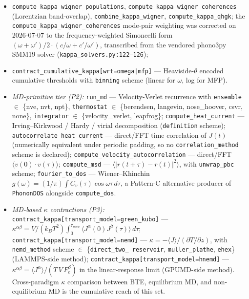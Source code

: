\documentclass[11pt,a4paper]{article}
\begin{document}
\begin{itemize}[leftmargin=2em, itemsep=0.2em]
  \item \texttt{compute\_kappa\_wigner\_populations},
        \texttt{compute\_kappa\_wigner\_coherences} (Lorentzian
        band-overlap), \texttt{combine\_kappa\_wigner},
        \texttt{compute\_kappa\_qhgk}; the \texttt{compute\_kappa\_wigner\_coherences}
        mode-pair weighting was corrected on 2026-07-07 to the frequency-weighted
        Simoncelli form $(\omega+\omega')/2\cdot(c/\omega + c'/\omega')$,
        transcribed from the vendored phono3py SMM19 solver
        (\texttt{kappa\_solvers.py:122--126});
  \item \texttt{contract\_cumulative\_kappa[wrt=omega|mfp]} ---
        Heaviside-$\theta$ encoded cumulative thresholds with
        \texttt{binning} scheme (linear for $\omega$, log for MFP).
  \item \emph{MD-primitive tier (P2):}
        \texttt{run\_md} --- Velocity-Verlet recurrence with
        \texttt{ensemble} $\in$ \{nve, nvt, npt\},
        \texttt{thermostat} $\in$ \{berendsen, langevin, nose\_hoover,
        csvr, none\}, \texttt{integrator} $\in$ \{velocity\_verlet,
        leapfrog\};
        \texttt{compute\_heat\_current} --- Irving--Kirkwood / Hardy
        / virial decomposition (\texttt{definition} scheme);
        \texttt{autocorrelate\_heat\_current} --- direct/FFT time
        correlation of $J(t)$ (numerically equivalent under periodic
        padding, so no \texttt{correlation\_method} scheme is declared);
        \texttt{compute\_velocity\_autocorrelation} --- direct/FFT
        $\langle v(0)\cdot v(\tau)\rangle$;
        \texttt{compute\_msd} --- $\langle |r(t+\tau)-r(t)|^2\rangle$,
        with \texttt{unwrap\_pbc} scheme;
        \texttt{fourier\_to\_dos} --- Wiener--Khinchin $g(\omega) =
        (1/\pi)\int C_v(\tau)\cos\omega\tau\,d\tau$, a Pattern-C
        alternative producer of \texttt{PhononDOS} alongside
        \texttt{compute\_dos}.
  \item \emph{MD-based $\kappa$ contractions (P3):}
        \texttt{contract\_kappa[transport\_model=green\_kubo]} ---
        $\kappa^{\alpha\beta} = V/(k_B T^2) \int_0^{\tau_{max}}
        \langle J^\alpha(0)J^\beta(\tau)\rangle\,d\tau$;
        \texttt{contract\_kappa[transport\_model=nemd]} ---
        $\kappa = -\langle J\rangle / (\partial T/\partial z)$, with
        \texttt{nemd\_method} scheme $\in$ \{\texttt{direct\_two\_
        reservoir}, \texttt{muller\_plathe}, \texttt{ehex}\} (LAMMPS-side
        method);
        \texttt{contract\_kappa[transport\_model=hnemd]} ---
        $\kappa^{\alpha\beta} = \langle J^\alpha\rangle / (T\,V\,F_e^\beta)$
        in the linear-response limit (GPUMD-side method). Cross-paradigm
        $\kappa$ comparison between BTE, equilibrium MD, and
        non-equilibrium MD is the cumulative reach of this set.
\end{itemize}
\end{document}
